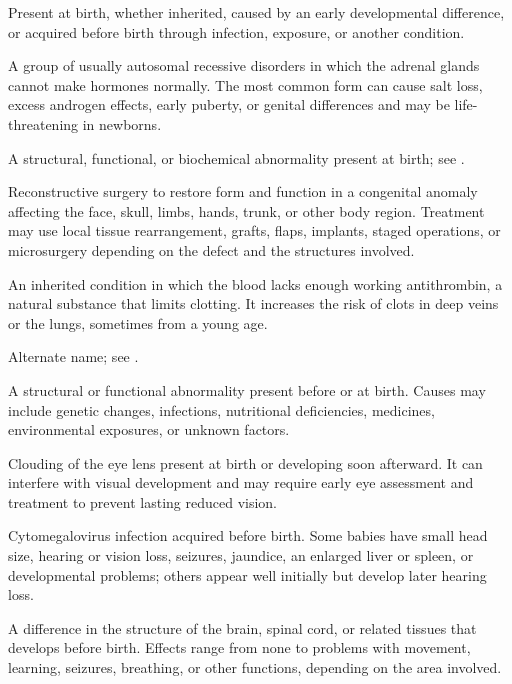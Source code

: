  Present at birth, whether inherited, caused by an early developmental difference, or acquired before birth through infection, exposure, or another condition.

 A group of usually autosomal recessive disorders in which the adrenal glands cannot make hormones normally. The most common form can cause salt loss, excess androgen effects, early puberty, or genital differences and may be life-threatening in newborns.

 A structural, functional, or biochemical abnormality present at birth; see .

 Reconstructive surgery to restore form and function in a congenital anomaly affecting the face, skull, limbs, hands, trunk, or other body region. Treatment may use local tissue rearrangement, grafts, flaps, implants, staged operations, or microsurgery depending on the defect and the structures involved.

 An inherited condition in which the blood lacks enough working antithrombin, a natural substance that limits clotting. It increases the risk of clots in deep veins or the lungs, sometimes from a young age.

 Alternate name; see .

 A structural or functional abnormality present before or at birth. Causes may include genetic changes, infections, nutritional deficiencies, medicines, environmental exposures, or unknown factors.

 Clouding of the eye lens present at birth or developing soon afterward. It can interfere with visual development and may require early eye assessment and treatment to prevent lasting reduced vision.

 Cytomegalovirus infection acquired before birth. Some babies have small head size, hearing or vision loss, seizures, jaundice, an enlarged liver or spleen, or developmental problems; others appear well initially but develop later hearing loss.

 A difference in the structure of the brain, spinal cord, or related tissues that develops before birth. Effects range from none to problems with movement, learning, seizures, breathing, or other functions, depending on the area involved.

